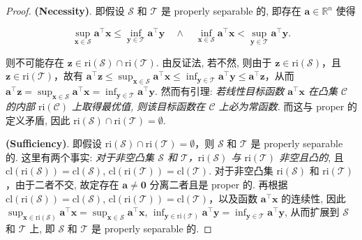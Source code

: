 \begin{thmblock}
\begin{proof}{}
\textbf{(Necessity)}. 即假设 $\mathcal{S}$ 和 $\mathcal{T}$ 是 properly separable 的, 即存在 $\bm{a} \in \mathbb{R}^n$ 使得

\[
\sup_{\bm{x} \in \mathcal{S}} \bm{a}^\top \bm{x} \leq \inf_{\bm{y} \in \mathcal{T}} \bm{a}^\top \bm{y} \quad \land \quad \inf_{\bm{x} \in \mathcal{S}} \bm{a}^\top \bm{x} < \sup_{\bm{y} \in \mathcal{T}} \bm{a}^\top \bm{y}.
\]

则不可能存在 $\bm{z} \in \text{ri}(\mathcal{S}) \cap \text{ri}(\mathcal{T})$. 由反证法, 若不然, 则由于 $\bm{z} \in \text{ri}(\mathcal{S})$，且 $\bm{z} \in \text{ri}(\mathcal{T})$，故有 $\bm{a}^\top \bm{z} \leq \sup_{\bm{x} \in \mathcal{S}} \bm{a}^\top \bm{x} \leq \inf_{\bm{y} \in \mathcal{T}} \bm{a}^\top \bm{y} \leq \bm{a}^\top \bm{z}$，从而 $\bm{a}^\top \bm{z} = \sup_{\bm{x} \in \mathcal{S}} \bm{a}^\top \bm{x} = \inf_{\bm{y} \in \mathcal{T}} \bm{a}^\top \bm{y}$. 然而有引理: \emph{若线性目标函数 $\bm{a}^\top \bm{x}$ 在凸集 $\mathcal{C}$ 的内部 $\text{ri}(\mathcal{C})$ 上取得最优值, 则该目标函数在 $\mathcal{C}$ 上必为常函数.} 而这与 proper 的定义矛盾, 因此 $\text{ri}(\mathcal{S}) \cap \text{ri}(\mathcal{T}) = \emptyset$.

\textbf{(Sufficiency)}. 即假设 $\text{ri}(\mathcal{S}) \cap \text{ri}(\mathcal{T}) = \emptyset$，则 $\mathcal{S}$ 和 $\mathcal{T}$ 是 properly separable 的. 这里有两个事实: \emph{对于非空凸集 $\mathcal{S}$ 和 $\mathcal{T}$，$\text{ri}(\mathcal{S})$ 与 $\text{ri}(\mathcal{T})$ 非空且凸的}, 且 $\text{cl}(\text{ri}(\mathcal{S})) = \text{cl}(\mathcal{S})$, $\text{cl}(\text{ri}(\mathcal{T})) = \text{cl}(\mathcal{T})$. 对于非空凸集 $\text{ri}(\mathcal{S})$ 和 $\text{ri}(\mathcal{T})$，由于二者不交, 故定存在 $\bm{a} \neq \bm{0}$ 分离二者且是 proper 的. 再根据 $\text{cl}(\text{ri}(\mathcal{S})) = \text{cl}(\mathcal{S})$, $\text{cl}(\text{ri}(\mathcal{T})) = \text{cl}(\mathcal{T})$，以及函数 $\bm{a}^\top \bm{x}$ 的连续性, 因此 $\sup_{\bm{x} \in \text{ri}(\mathcal{S})} \bm{a}^\top \bm{x} = \sup_{\bm{x} \in \mathcal{S}} \bm{a}^\top \bm{x}$, $\inf_{\bm{y} \in \text{ri}(\mathcal{T})} \bm{a}^\top \bm{y} = \inf_{\bm{y} \in \mathcal{T}} \bm{a}^\top \bm{y}$, 从而扩展到 $\mathcal{S}$ 和 $\mathcal{T}$ 上, 即 $\mathcal{S}$ 和 $\mathcal{T}$ 是 properly separable 的.

\end{proof}

\end{thmblock}


